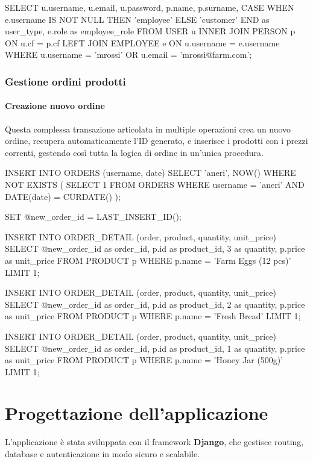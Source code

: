 \documentclass[a4paper,12pt]{report}
\begin{document}
\begin{sqlcode}[caption={Query per verifica login}]
SELECT u.username, u.email, u.password, p.name, p.surname,
       CASE WHEN e.username IS NOT NULL THEN 'employee' ELSE 'customer' END as user_type,
       e.role as employee_role 
FROM USER u 
INNER JOIN PERSON p ON u.cf = p.cf 
LEFT JOIN EMPLOYEE e ON u.username = e.username 
WHERE u.username = 'mrossi' OR u.email = 'mrossi@farm.com';
\end{sqlcode}

\subsection{Gestione ordini prodotti} 

\subsubsection{Creazione nuovo ordine} 
Questa complessa transazione articolata in multiple operazioni crea un nuovo ordine, recupera automaticamente l'ID generato, e inserisce i prodotti con i prezzi correnti, gestendo così tutta la logica di ordine in un'unica procedura.

\begin{sqlcode}[caption={Query per creazione ordine}]
INSERT INTO ORDERS (username, date) 
SELECT 'aneri', NOW() 
WHERE NOT EXISTS (
  SELECT 1 
  FROM ORDERS 
  WHERE username = 'aneri' AND DATE(date) = CURDATE()
);

SET @new_order_id = LAST_INSERT_ID();

INSERT INTO ORDER_DETAIL (order, product, quantity, unit_price) 
SELECT @new_order_id as order_id, p.id as product_id, 3 as quantity, p.price as unit_price 
FROM PRODUCT p 
WHERE p.name = 'Farm Eggs (12 pcs)' 
LIMIT 1;

INSERT INTO ORDER_DETAIL (order, product, quantity, unit_price) 
SELECT @new_order_id as order_id, p.id as product_id, 2 as quantity, p.price as unit_price 
FROM PRODUCT p 
WHERE p.name = 'Fresh Bread' 
LIMIT 1;

INSERT INTO ORDER_DETAIL (order, product, quantity, unit_price) 
SELECT @new_order_id as order_id, p.id as product_id, 1 as quantity, p.price as unit_price 
FROM PRODUCT p 
WHERE p.name = 'Honey Jar (500g)' 
LIMIT 1;
\end{sqlcode}

\chapter{Progettazione dell'applicazione}
L'applicazione è stata sviluppata con il framework \textbf{Django},
che gestisce routing,
database e autenticazione in modo sicuro e scalabile.
\end{document}
